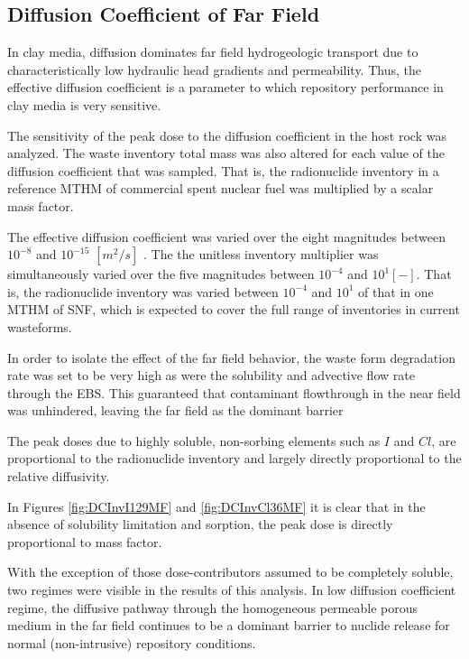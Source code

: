 
\subsection{Diffusion Coefficient of Far Field}
\label{sec:diffusivity}

In clay media, diffusion dominates far field hydrogeologic transport due to 
characteristically low hydraulic head gradients and permeability. Thus, the 
effective diffusion coefficient is a parameter to which repository performance 
in clay media is very sensitive. 

The sensitivity of the peak dose to the diffusion coefficient in the 
host rock was analyzed. 
The waste inventory total mass was also altered for each value of the diffusion  
coefficient that was sampled. That is, the radionuclide inventory in a reference 
\gls{MTHM} of commercial spent nuclear fuel was multiplied by a scalar mass factor.  

The effective diffusion coefficient was varied over the eight magnitudes between $ 
10^{-8}$ and $10^{-15}$ $[m^2 /s]$ .  The the unitless inventory 
multiplier was simultaneously varied over the five magnitudes between $10^{-4}$ 
and $10^{1} [-]$. That is, the radionuclide inventory was varied between 
$10^{-4}$ and $10^{1}$ of that in one \gls{MTHM} of \gls{SNF}, which is expected 
to cover the full range of inventories in current wasteforms.

In order to isolate the effect of the far field behavior, the waste form 
degradation rate was set to be very high as were the solubility and advective 
flow rate through the  \gls{EBS}. This guaranteed that contaminant flowthrough 
in the near field was unhindered, leaving the far field as the dominant barrier 

The peak doses due to highly soluble, non-sorbing elements such as $I$ and $Cl$, 
are  proportional to the radionuclide inventory and 
largely directly proportional to the relative diffusivity. 

In Figures \ref{fig:DCInvI129MF} and \ref{fig:DCInvCl36MF} it is clear that in the 
absence of solubility limitation and sorption, the peak dose is directly 
proportional to mass factor. 

With the exception of those dose-contributors assumed to be completely soluble, 
two regimes were visible in the results of this analysis. In low diffusion 
coefficient regime, the diffusive pathway through the homogeneous permeable 
porous medium in the far field continues to be a  dominant barrier to nuclide 
release for normal (non-intrusive) repository conditions. 

